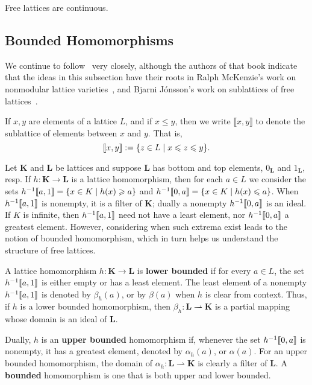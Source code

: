 \begin{theorem}
  Free lattices are continuous.
\end{theorem}


\subsection{Bounded Homomorphisms}
\label{sec:introduction}
We continue to follow~\cite{MR1319815} very closely,
although the authors of that book indicate that the ideas in this 
subsection have their roots in Ralph McKenzie's work on nonmodular 
lattice varieties~\cite{MR0313141}, and Bjarni J\'onsson's work on 
sublattices of free lattices~\cite{MR0472614}.

If $x, y$ are elements of a lattice $L$, and if $x \leq y$, then we write
$\llbracket x, y \rrbracket$ to denote the sublattice of elements between $x$ and $y$.
That is, 
\[
\llbracket x, y \rrbracket := \{z \in L \mid x \leqslant z \leqslant y \}.
\]

Let $\mathbf K$ and $\mathbf L$ be lattices and suppose $\mathbf L$ has bottom and top elements, 
$0_{\mathbf L}$ and $1_{\mathbf L}$, resp.  
If $h \colon \mathbf K \to \mathbf L$ is a lattice homomorphism, then for each
$a \in L$ we consider the sets $h^{-1}\llbracket a, 1 \rrbracket = \{x \in K \mid h(x) \geqslant a\}$ and
$h^{-1}\llbracket 0, a \rrbracket = \{x \in K \mid h(x) \leqslant a \}$. 
When $h^{-1}\llbracket a, 1 \rrbracket$ is nonempty,
it is a filter of $\mathbf K$; dually a nonempty $h^{-1}\llbracket 0, a \rrbracket$ is an ideal. 
If $K$ is infinite, then 
$h^{-1}\llbracket a, 1 \rrbracket$ need not have a least element, nor 
$h^{-1}\llbracket 0, a \rrbracket$ a greatest element. However, 
considering when such extrema exist leads to the notion of
bounded homomorphism, which in turn helps us understand the structure of free lattices.


A lattice homomorphism $h \colon \mathbf K \to \mathbf L$ is \textbf{lower bounded} if for every 
$a \in L$, the set $h^{-1} \llbracket a, 1 \rrbracket$ is either empty or has a least element. 
The least element of a nonempty $h^{-1}\llbracket a, 1\rrbracket$ is denoted by $\beta_h(a)$, or  
by $\beta(a)$ when $h$ is clear from context.
Thus, if $h$ is a lower bounded homomorphism, then 
$\beta_h \colon \mathbf L \rightharpoonup \mathbf K$ 
is a partial mapping whose domain is an ideal of $\mathbf L$. 

Dually, $h$ is an \textbf{upper bounded} homomorphism if, whenever the set
$h^{-1}\llbracket 0, a \rrbracket$ is nonempty, it has a greatest element, denoted by 
$\alpha_h(a)$, or $\alpha (a)$.
For an upper bounded homomorphism, the domain of 
$\alpha_h \colon \mathbf L \rightharpoonup \mathbf K$ 
is clearly a filter of $\mathbf L$.  
A \textbf{bounded} homomorphism is one that is both upper and lower bounded.

